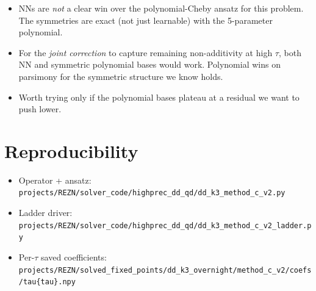 \documentclass[11pt]{article}
\begin{document}
\begin{itemize}
  \item NNs are \emph{not} a clear win over the polynomial-Cheby ansatz
        for this problem. The symmetries are exact (not just learnable)
        with the 5-parameter polynomial.
  \item For the \emph{joint correction} to capture remaining
        non-additivity at high $\tau$, both NN and symmetric polynomial
        bases would work. Polynomial wins on parsimony for the symmetric
        structure we know holds.
  \item Worth trying only if the polynomial bases plateau at a residual
        we want to push lower.
\end{itemize}

\section{Reproducibility}

\begin{itemize}
  \item Operator + ansatz:
        \texttt{projects/REZN/solver\_code/highprec\_dd\_qd/dd\_k3\_method\_c\_v2.py}
  \item Ladder driver:
        \texttt{projects/REZN/solver\_code/highprec\_dd\_qd/dd\_k3\_method\_c\_v2\_ladder.py}
  \item Per-$\tau$ saved coefficients:
        \texttt{projects/REZN/solved\_fixed\_points/dd\_k3\_overnight/method\_c\_v2/coefs/tau\{tau\}.npy}
\end{itemize}
\end{document}
